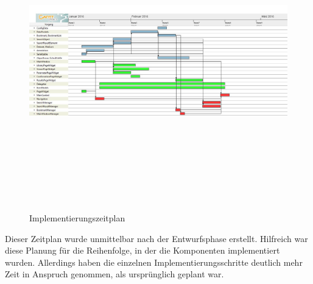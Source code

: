 \begin{figure}[H]
\includegraphics[width=18cm, height=13cm, angle = 90]{Zeitplan}
\caption{Implementierungszeitplan}
\end{figure}

Dieser Zeitplan wurde unmittelbar nach der Entwurfsphase erstellt. Hilfreich war diese Planung für die Reihenfolge, in der die Komponenten implementiert wurden. Allerdings haben die einzelnen Implementierungsschritte deutlich mehr Zeit in Anspruch genommen, als ursprünglich geplant war.